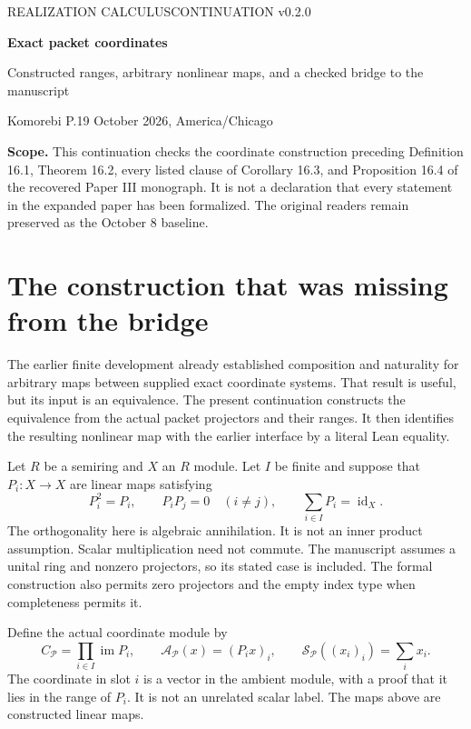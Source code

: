 \documentclass[11pt]{article}
\newcommand{\A}{\mathcal A}\newcommand{\Synthesis}{\mathcal S}
\newcommand{\Pcal}{\mathcal P}\newcommand{\Qcal}{\mathcal Q}\newcommand{\Rcal}{\mathcal R}
\begin{document}
\thispagestyle{empty}
{\small\sffamily\color{ink} REALIZATION CALCULUS\hfill CONTINUATION v0.2.0}\par
\vspace{1.0em}
{\LARGE\bfseries Exact packet coordinates\par}
{\large Constructed ranges, arbitrary nonlinear maps, and a checked bridge to the manuscript\par}
\vspace{0.5em}
Komorebi P.\hfill 19 October 2026, America/Chicago

\textbf{Scope.} This continuation checks the coordinate construction preceding Definition 16.1, Theorem 16.2, every listed clause of Corollary 16.3, and Proposition 16.4 of the recovered Paper III monograph. It is not a declaration that every statement in the expanded paper has been formalized. The original readers remain preserved as the October 8 baseline.

\section{The construction that was missing from the bridge}
The earlier finite development already established composition and naturality for arbitrary maps between supplied exact coordinate systems. That result is useful, but its input is an equivalence. The present continuation constructs the equivalence from the actual packet projectors and their ranges. It then identifies the resulting nonlinear map with the earlier interface by a literal Lean equality.

Let $R$ be a semiring and $X$ an $R$ module. Let $I$ be finite and suppose that $P_i\colon X\to X$ are linear maps satisfying
\[
  P_i^2=P_i,\qquad P_iP_j=0\quad(i\ne j),\qquad \sum_{i\in I}P_i=\operatorname{id}_X.
\]
The orthogonality here is algebraic annihilation. It is not an inner product assumption. Scalar multiplication need not commute. The manuscript assumes a unital ring and nonzero projectors, so its stated case is included. The formal construction also permits zero projectors and the empty index type when completeness permits it.

Define the actual coordinate module by
\[
 C_{\Pcal}=\prod_{i\in I}\operatorname{im}P_i,
 \qquad \A_{\Pcal}(x)=(P_ix)_i,
 \qquad \Synthesis_{\Pcal}((x_i)_i)=\sum_i x_i.
\]
The coordinate in slot $i$ is a vector in the ambient module, with a proof that it lies in the range of $P_i$. It is not an unrelated scalar label. The maps above are constructed linear maps.
\end{document}
